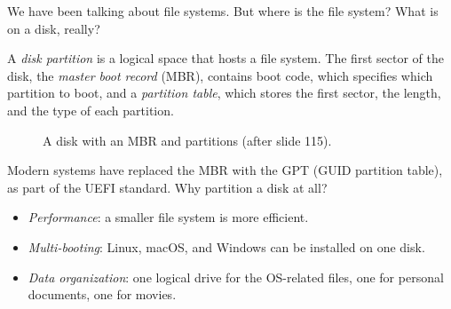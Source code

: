 We have been talking about file systems. But where is the file system? What is on a disk, really?

\begin{definition}
  A \emph{disk partition} is a logical space that hosts a file system. The first sector of the disk, the \emph{master boot record} (MBR), contains boot code, which specifies which partition to boot, and a \emph{partition table}, which stores the first sector, the length, and the type of each partition.
\end{definition}

\begin{figure}[H]
\centering
{}
\caption{A disk with an MBR and partitions (after slide 115).}
\label{fig:partitions}
\end{figure}

Modern systems have replaced the MBR with the GPT (GUID partition table), as part of the UEFI standard. Why partition a disk at all?
\begin{itemize}
  \item \emph{Performance}: a smaller file system is more efficient.
  \item \emph{Multi-booting}: Linux, macOS, and Windows can be installed on one disk.
  \item \emph{Data organization}: one logical drive for the OS-related files, one for personal documents, one for movies.
\end{itemize}

